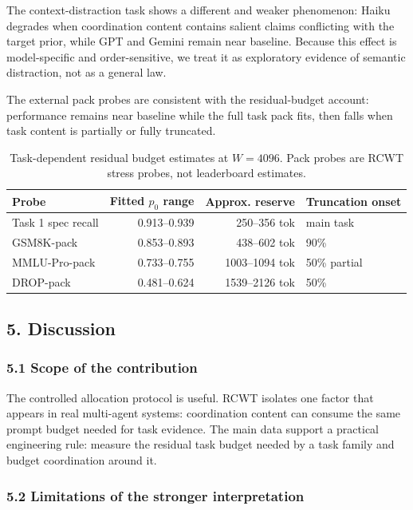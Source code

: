 \documentclass[
  runningheads]{llncs}
\begin{document}
The context-distraction task shows a different and weaker phenomenon:
Haiku degrades when coordination content contains salient claims
conflicting with the target prior, while GPT and Gemini remain near
baseline. Because this effect is model-specific and order-sensitive, we
treat it as exploratory evidence of semantic distraction, not as a
general law.

The external pack probes are consistent with the residual-budget
account: performance remains near baseline while the full task pack
fits, then falls when task content is partially or fully truncated.

\begin{table}[t]
\centering
\small
\caption{Task-dependent residual budget estimates at $W=4096$. Pack probes are RCWT stress probes, not leaderboard estimates.}
\begin{tabular}{lrrl}
\toprule
Probe & Fitted $p_0$ range & Approx. reserve & Truncation onset \\
\midrule
Task 1 spec recall & 0.913--0.939 & 250--356 tok & main task \\
GSM8K-pack & 0.853--0.893 & 438--602 tok & 90\% \\
MMLU-Pro-pack & 0.733--0.755 & 1003--1094 tok & 50\% partial \\
DROP-pack & 0.481--0.624 & 1539--2126 tok & 50\% \\
\bottomrule
\end{tabular}
\end{table}

\subsection{5. Discussion}\label{discussion}

\subsubsection{5.1 Scope of the
contribution}\label{scope-of-the-contribution}

The controlled allocation protocol is useful. RCWT isolates one factor
that appears in real multi-agent systems: coordination content can
consume the same prompt budget needed for task evidence. The main data
support a practical engineering rule: measure the residual task budget
needed by a task family and budget coordination around it.

\subsubsection{5.2 Limitations of the stronger
interpretation}\label{limitations-of-the-stronger-interpretation}
\end{document}
